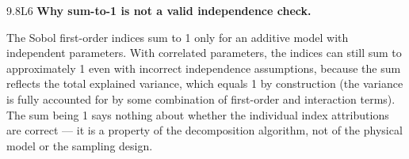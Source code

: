 \begin{solution}{9.8}{L6}
 \textbf{Why sum-to-1 is not a valid independence check.}

The Sobol first-order indices sum to 1 only for an additive model
with independent parameters. With correlated parameters, the indices
can still sum to approximately 1 even with incorrect independence assumptions,
because the sum reflects the total explained variance, which equals 1 by
construction (the variance is fully accounted for by some combination of
first-order and interaction terms). The sum being 1 says nothing about
whether the individual index attributions are correct — it is a property
of the decomposition algorithm, not of the physical model or the sampling design.


\end{solution}
